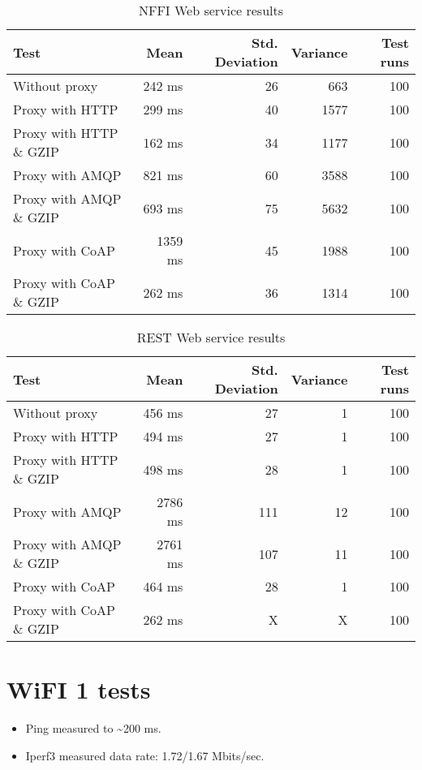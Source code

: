 \begin{appendices}
\begin{table}[H]
\begin{tabular}{| l | r | r | r | r |}
\hline
  \textbf{Test} & \textbf{Mean} & \textbf{Std. Deviation} & \textbf{Variance} & \textbf{Test runs}\\ \hline
  Without proxy & 242 ms & 26 & 663 & 100 \\ \hline
  Proxy with HTTP & 299 ms & 40 & 1577 & 100 \\ \hline
  Proxy with HTTP \& GZIP & 162 ms & 34 & 1177 & 100 \\ \hline
  Proxy with AMQP & 821 ms & 60 & 3588 & 100 \\ \hline
  Proxy with AMQP \& GZIP & 693 ms & 75 & 5632 & 100\\ \hline
  Proxy with CoAP & 1359 ms & 45 & 1988 & 100 \\ \hline
  Proxy with CoAP \& GZIP & 262 ms & 36 & 1314 & 100 \\ \hline
\end{tabular}
\caption{NFFI Web service results}
\end{table}


\begin{table}[H]
\begin{tabular}{| l | r | r | r | r |}
\hline
  \textbf{Test} & \textbf{Mean} & \textbf{Std. Deviation} & \textbf{Variance} & \textbf{Test runs}\\ \hline
  Without proxy & 456 ms & 27 & 1 & 100 \\ \hline
  Proxy with HTTP & 494 ms & 27 & 1 & 100 \\ \hline
  Proxy with HTTP \& GZIP & 498 ms & 28 & 1 & 100 \\ \hline
  Proxy with AMQP & 2786 ms & 111 & 12 & 100 \\ \hline
  Proxy with AMQP \& GZIP & 2761 ms & 107 & 11 & 100\\ \hline
  Proxy with CoAP & 464 ms & 28 & 1 & 100 \\ \hline
  Proxy with CoAP \& GZIP & 262 ms & X & X & 100 \\ \hline
\end{tabular}
\caption{REST Web service results}
\end{table}




\section{WiFI 1 tests}

\begin{itemize}
	\item Ping measured to \textasciitilde 200 ms.
	\item Iperf3 measured data rate: 1.72/1.67 Mbits/sec.
\end{itemize}


\end{appendices}

